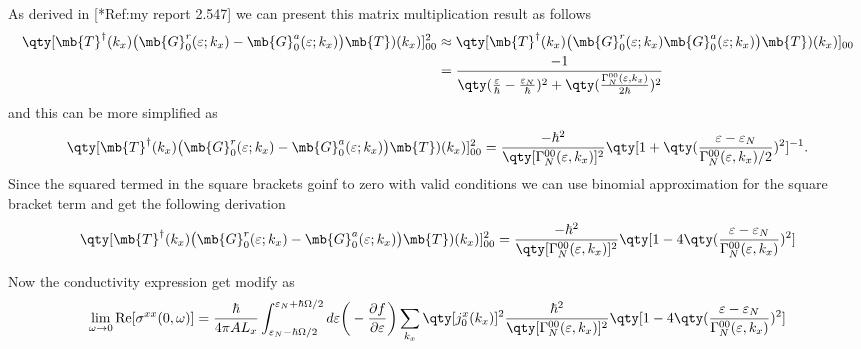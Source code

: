 As derived in [*Ref:my report 2.547] we can present this matrix multiplication result as follows
\begin{equation} \label{6.14}
  \begin{aligned}
    \qty[
    \mb{T}^{\dagger}(k_x)
    \big(
    \mb{G}^{r}_0 (\varepsilon;{k_x}) - \mb{G}^{a}_0 (\varepsilon;{k_x})
    \big)
    \mb{T})(k_x)
    ]^2_{00} &
    \approx
    \qty[
    \mb{T}^{\dagger}(k_x)
    \big(
    \mb{G}^{r}_0 (\varepsilon;{k_x})\mb{G}^{a}_0 (\varepsilon;{k_x})
    \big)
    \mb{T})(k_x)
    ]_{00} \\
    & =
    \frac{-1}
    {
      \qty(\frac{\varepsilon}{\hbar} - \frac{\varepsilon_N}{\hbar})^2
      +
      \qty(\frac{\Gamma^{00}_{N}(\varepsilon,k_x)}{2\hbar})^2
    }
  \end{aligned}
\end{equation}
and this can be more simplified as
\begin{equation} \label{6.15}
  \begin{aligned}
    \qty[
    \mb{T}^{\dagger}(k_x)
    \big(
    \mb{G}^{r}_0 (\varepsilon;{k_x}) - \mb{G}^{a}_0 (\varepsilon;{k_x})
    \big)
    \mb{T})(k_x)
    ]^2_{00} =
    \frac{-\hbar^2}
    {\qty[\Gamma^{00}_{N}(\varepsilon,k_x)]^2}
    \qty[
      1 +
      \qty(\frac{{\varepsilon}-{\varepsilon_N}}{\Gamma^{00}_{N}(\varepsilon,k_x)/2})^2
    ]^{-1}.
  \end{aligned}
\end{equation}
Since the squared termed in the square brackets goinf to zero with valid conditions we can use binomial approximation for the square bracket term and get the following derivation
\begin{equation} \label{6.16}
  \begin{aligned}
    \qty[
    \mb{T}^{\dagger}(k_x)
    \big(
    \mb{G}^{r}_0 (\varepsilon;{k_x}) - \mb{G}^{a}_0 (\varepsilon;{k_x})
    \big)
    \mb{T})(k_x)
    ]^2_{00} =
    \frac{-\hbar^2}
    {\qty[\Gamma^{00}_{N}(\varepsilon,k_x)]^2}
    \qty[
      1 -
      4\qty(\frac{{\varepsilon}-{\varepsilon_N}}{\Gamma^{00}_{N}(\varepsilon,k_x)})^2
    ]
  \end{aligned}
\end{equation}

\noindent
Now the conductivity expression get modify as
\begin{equation} \label{6.17}
  \begin{aligned}
    \lim_{\omega \to 0}
    \text{Re}[{\sigma}^{xx}(0,\omega)] =
    \frac{\hbar}{4\pi A L_x}
    \int_{\varepsilon_N - \hbar\Omega/2}^{\varepsilon_N + \hbar\Omega/2} d\varepsilon
    \bigg(
    -\frac{\partial f}{\partial \varepsilon} \bigg)
    \sum_{{k_x}}
    \qty[{j}^x_0({k_x})]^2
    \frac{\hbar^2}
    {\qty[\Gamma^{00}_{N}(\varepsilon,k_x)]^2}
    \qty[
      1 -
      4\qty(\frac{{\varepsilon}-{\varepsilon_N}}{\Gamma^{00}_{N}(\varepsilon,k_x)})^2
    ]
  \end{aligned}
\end{equation}

